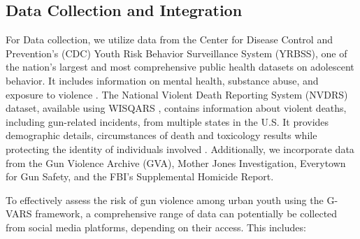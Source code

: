 \documentclass[11pt]{article}
\begin{document}
\subsection{Data Collection and Integration}

For Data collection, we utilize data from the Center for Disease Control and Prevention’s (CDC) Youth Risk Behavior Surveillance System (YRBSS), one of the nation’s largest and most comprehensive public health datasets on adolescent behavior. It includes information on mental health, substance abuse, and exposure to violence \cite{yrbss_2023}. The National Violent Death Reporting System (NVDRS) dataset, available using WISQARS \cite{cdc_2021}, contains information about violent deaths, including gun-related incidents, from multiple states in the U.S. It provides demographic details, circumstances of death and toxicology results while protecting the identity of individuals involved \cite{nvdrs_cdc_2023}. Additionally, we incorporate data from the Gun Violence Archive (GVA), Mother Jones Investigation, Everytown for Gun Safety, and the FBI’s Supplemental Homicide Report.
\par 
To effectively assess the risk of gun violence among urban youth using the \textsf{G-VARS} framework, a comprehensive range of data can potentially be collected from social media platforms, depending on their access. This includes:
\end{document}
